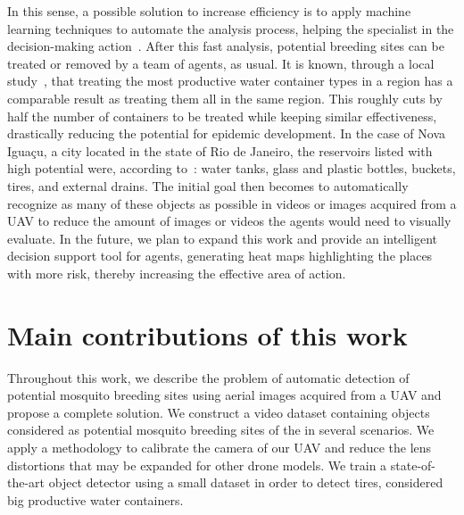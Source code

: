 In this sense, a possible solution to increase efficiency is to apply machine learning techniques to automate the analysis process, helping the specialist in the decision-making action~\cite{casfinal2018}.
After this fast analysis, potential breeding sites can be treated or removed by a team of agents, as usual.
It is known, through a local study~\cite{tun2009reducing}, that treating the most productive water container types in a region has a comparable result as treating them all in the same region.
This roughly cuts by half the number of containers to be treated while keeping similar effectiveness, drastically reducing the potential for epidemic development.
In the case of Nova Iguaçu, a city located in the state of Rio de Janeiro, the reservoirs listed with high potential were, according to~\cite{Lagrotta2006}: water tanks, glass and plastic bottles, buckets, tires, and external drains.
The initial goal then becomes to automatically recognize as many of these objects as possible in videos or images acquired from a UAV
to reduce the amount of images or videos the agents would need to visually evaluate.
In the future, we plan to expand this work and provide an intelligent decision support tool for agents, generating heat maps highlighting the places with more risk, thereby increasing the effective area of action.

\section{Main contributions of this work}
%
Throughout this work,
we describe the problem of automatic detection of potential mosquito breeding sites using aerial images acquired from a UAV
and propose a complete solution.
%
We construct a video dataset containing objects considered as potential mosquito breeding sites of the \Aedes in several scenarios.
%
We apply a methodology to calibrate the camera of our UAV and reduce the lens distortions that may be expanded for other drone models.
%
We train a state-of-the-art object detector using a small dataset in order to detect tires, considered big productive water containers.
%

